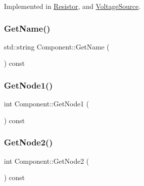 Implemented in \hyperlink{classResistor_a1e2d669a6b28b5b46457af5caae7462c}{Resistor}, and \hyperlink{classVoltageSource_a74f8a6a57480e9cff24414e106d2bbf1}{Voltage\+Source}.

\mbox{\label{classComponent_a9af52e1878212622948ab2189f4f29dd}} 
\subsubsection{\texorpdfstring{Get\+Name()}{GetName()}}
{\footnotesize\ttfamily std\+::string Component\+::\+Get\+Name (\begin{DoxyParamCaption}{ }\end{DoxyParamCaption}) const\hspace{0.3cm}{\ttfamily [inline]}}

\mbox{\label{classComponent_af6503c2bf9a88eff198ffbfcc3e24876}} 
\subsubsection{\texorpdfstring{Get\+Node1()}{GetNode1()}}
{\footnotesize\ttfamily int Component\+::\+Get\+Node1 (\begin{DoxyParamCaption}{ }\end{DoxyParamCaption}) const\hspace{0.3cm}{\ttfamily [inline]}}

\mbox{\label{classComponent_aac8e1e6f5ecd3529912bd4afa0903921}} 
\subsubsection{\texorpdfstring{Get\+Node2()}{GetNode2()}}
{\footnotesize\ttfamily int Component\+::\+Get\+Node2 (\begin{DoxyParamCaption}{ }\end{DoxyParamCaption}) const\hspace{0.3cm}{\ttfamily [inline]}}

\mbox{\label{classComponent_a7c6ba16177143bc9945583a9c3df4c89}} 
